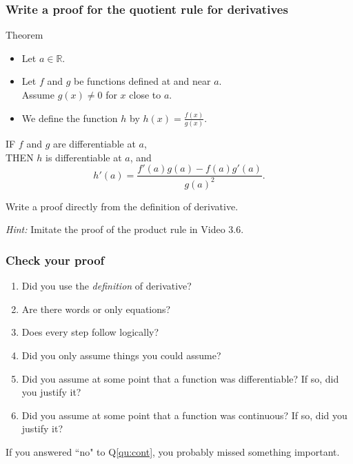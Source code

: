 \documentclass[14pt]{beamer}
\begin{document}
	\begin{frame}[t]
		\fontsize{13}{13}\selectfont
		\frametitle{Write a proof for the quotient rule for derivatives}

		\begin{block}{Theorem}
			\begin{itemize}
				\item Let $a \in \mathbb{R}$.

				\item Let $f$ and $g$ be functions defined at and near $a$. \\ Assume
					$g(x) \neq 0$ for $x$ close to $a$.

				\item We define the function $h$ by $\displaystyle h(x) = \frac{f(x)}{g(x)}$.
			\end{itemize}

			IF $f$ and $g$ are differentiable at $a$, \\ THEN $h$ is differentiable at
			$a$, and
			\[
				h'(a) = \frac{f'(a) g(a) - f(a) g'(a)}{g(a)^{2}}.
			\]
		\end{block}

		\vfill

		Write a proof directly from the definition of derivative.

		\emph{Hint:} Imitate the proof of the product rule in Video 3.6.
	\end{frame}


	\begin{frame}[t]
		\frametitle{Check your proof}

		\begin{enumerate}
			\item Did you use the \emph{definition} of derivative?

			\item Are there words or only equations?

			\item Does every step follow logically?

			\item Did you only assume things you could assume?

			\item Did you assume at some point that a function was differentiable? If
				so, did you justify it?

			\item \label{qu:cont} Did you assume at some point that a function was continuous?
				If so, did you justify it?
		\end{enumerate}

		If you answered ``no" to Q\ref{qu:cont}, you probably missed something
		important.
	\end{frame}
\end{document}
